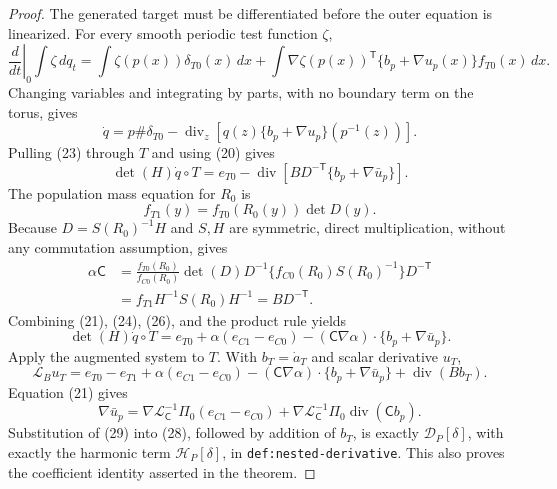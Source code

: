 \documentclass{article}
\begin{document}
\begin{proof}
The generated target must be differentiated before the outer equation is linearized.  For every smooth periodic test function \(\zeta\),
\[
 \left.\frac d{dt}\right|_0\int\zeta\,dq_t
 =\int\zeta(p(x))\delta_{T0}(x)\,dx
 +\int\nabla\zeta(p(x))^{\mathsf T}
       \{b_p+\nabla u_p(x)\}f_{T0}(x)\,dx.                             \tag{22}
\]
Changing variables and integrating by parts, with no boundary term on the torus, gives
\[
 \dot q=p\#\delta_{T0}
 -\operatorname{div}_z\!\left[q(z)
 \{b_p+\nabla u_p\}(p^{-1}(z))\right].                                \tag{23}
\]
Pulling (23) through \(T\) and using (20) gives
\[
 \det(H)\dot q\circ T=e_{T0}
 -\operatorname{div}\!\left[BD^{-\mathsf T}
 \{b_p+\nabla\bar u_p\}\right].                                     \tag{24}
\]
The population mass equation for \(R_0\) is
\[
 f_{T1}(y)=f_{T0}(R_0(y))\det D(y).                                    \tag{25}
\]
Because \(D=S(R_0)^{-1}H\) and \(S,H\) are symmetric, direct multiplication, without any commutation assumption, gives
\[
 \begin{aligned}
 \alpha\mathsf C
 &=\frac{f_{T0}(R_0)}{f_{C0}(R_0)}\det(D)D^{-1}
   \{f_{C0}(R_0)S(R_0)^{-1}\}D^{-\mathsf T}\\
 &=f_{T1}H^{-1}S(R_0)H^{-1}=BD^{-\mathsf T}.                           \tag{26}
 \end{aligned}
\]
Combining (21), (24), (26), and the product rule yields
\[
 \det(H)\dot q\circ T=e_{T0}+\alpha(e_{C1}-e_{C0})
 -(\mathsf C\nabla\alpha)\cdot\{b_p+\nabla\bar u_p\}.              \tag{27}
\]
Apply the augmented system to \(T\).  With \(b_T=\dot a_T\) and scalar derivative \(u_T\),
\[
 \mathcal L_Bu_T=e_{T0}-e_{T1}+\alpha(e_{C1}-e_{C0})
 -(\mathsf C\nabla\alpha)\cdot\{b_p+\nabla\bar u_p\}
 +\operatorname{div}(Bb_T).                                           \tag{28}
\]
Equation (21) gives
\[
 \nabla\bar u_p=
 \nabla\mathcal L_{\mathsf C}^{-1}\Pi_0(e_{C1}-e_{C0})
 +\nabla\mathcal L_{\mathsf C}^{-1}\Pi_0
   \operatorname{div}(\mathsf Cb_p).                                  \tag{29}
\]
Substitution of (29) into (28), followed by addition of \(b_T\), is exactly \(\mathcal D_P[\delta]\), with exactly the harmonic term \(\mathcal H_P[\delta]\), in \texttt{def:nested-derivative}.  This also proves the coefficient identity asserted in the theorem.


\end{proof}
\end{document}
